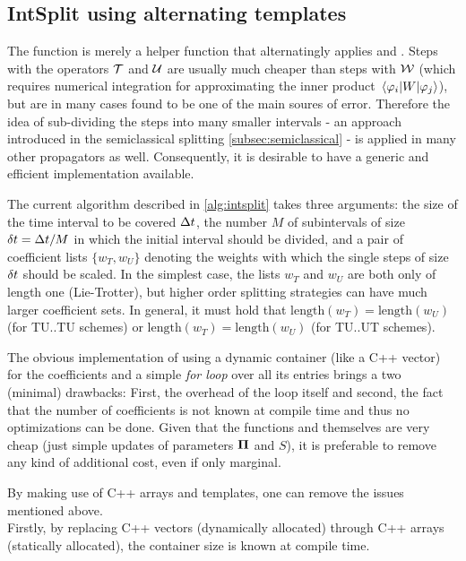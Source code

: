 \subsection{IntSplit using alternating templates}
\label{subsec:instplit}
%
The  function is merely a helper function that alternatingly applies  and .
Steps with the operators $\mathcal{T}$ and $\mathcal{U}$ are usually much cheaper than steps with $\mathcal{W}$ (which requires numerical integration for approximating the inner product $\matrixel{\varphi_i}{W}{\varphi_j}$), but are in many cases found to be one of the main soures of error.
Therefore the idea of sub-dividing the steps into many smaller intervals - an approach introduced in the semiclassical splitting \ref{subsec:semiclassical} - is applied in many other propagators as well.
Consequently, it is desirable to have a generic and efficient implementation available.
\par\medskip
%
The current  algorithm described in \ref{alg:intsplit} takes three arguments:
the size of the time interval to be covered $\Delta t$, the number $M$ of subintervals of size $\delta t = \Delta t/M$ in which the initial interval should be divided, and a pair of coefficient lists $\{ w_T, w_U \}$ denoting the weights with which the single steps of size $\delta t$ should be scaled.
In the simplest case, the lists $w_T$ and $w_U$ are both only of length one (Lie-Trotter), but higher order splitting strategies can have much larger coefficient sets.
In general, it must hold that $\text{length}(w_T) = \text{length}(w_U)$ (for TU..TU schemes) or $\text{length}(w_T) = \text{length}(w_U)$ (for TU..UT schemes).
\par\medskip
%
The obvious implementation of using a dynamic container (like a C++ vector) for the coefficients and a simple \emph{for loop} over all its entries brings a two (minimal) drawbacks: First, the overhead of the loop itself and second, the fact that the number of coefficients is not known at compile time and thus no optimizations can be done.
Given that the functions  and  themselves are very cheap (just simple updates of parameters $\bm{\Pi}$ and $S$), it is preferable to remove any kind of additional cost, even if only marginal.
\par\medskip
%
By making use of C++ arrays and templates, one can remove the issues mentioned above. \\
%
Firstly, by replacing C++ vectors (dynamically allocated) through C++ arrays (statically allocated), the container size is known at compile time.
